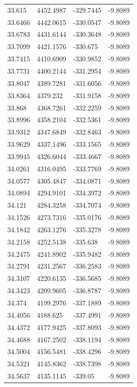 \begin{table}[H]
\begin{tabular}{llll}
33.615 & 4452.4987 & -329.7445 & -9.8089 \\
33.6466 & 4442.0615 & -330.0547 & -9.8089 \\
33.6783 & 4431.6144 & -330.3648 & -9.8089 \\
33.7099 & 4421.1576 & -330.675 & -9.8089 \\
33.7415 & 4410.6909 & -330.9852 & -9.8089 \\
33.7731 & 4400.2144 & -331.2954 & -9.8089 \\
33.8047 & 4389.7281 & -331.6056 & -9.8089 \\
33.8364 & 4379.232 & -331.9158 & -9.8089 \\
33.868 & 4368.7261 & -332.2259 & -9.8089 \\
33.8996 & 4358.2104 & -332.5361 & -9.8089 \\
33.9312 & 4347.6849 & -332.8463 & -9.8089 \\
33.9629 & 4337.1496 & -333.1565 & -9.8089 \\
33.9945 & 4326.6044 & -333.4667 & -9.8089 \\
34.0261 & 4316.0495 & -333.7769 & -9.8089 \\
34.0577 & 4305.4847 & -334.0871 & -9.8089 \\
34.0894 & 4294.9101 & -334.3972 & -9.8089 \\
34.121 & 4284.3258 & -334.7074 & -9.8089 \\
34.1526 & 4273.7316 & -335.0176 & -9.8089 \\
34.1842 & 4263.1276 & -335.3278 & -9.8089 \\
34.2158 & 4252.5138 & -335.638 & -9.8089 \\
34.2475 & 4241.8902 & -335.9482 & -9.8089 \\
34.2791 & 4231.2567 & -336.2583 & -9.8089 \\
34.3107 & 4220.6135 & -336.5685 & -9.8089 \\
34.3423 & 4209.9605 & -336.8787 & -9.8089 \\
34.374 & 4199.2976 & -337.1889 & -9.8089 \\
34.4056 & 4188.625 & -337.4991 & -9.8089 \\
34.4372 & 4177.9425 & -337.8093 & -9.8089 \\
34.4688 & 4167.2502 & -338.1194 & -9.8089 \\
34.5004 & 4156.5481 & -338.4296 & -9.8089 \\
34.5321 & 4145.8362 & -338.7398 & -9.8089 \\
34.5637 & 4135.1145 & -339.05 & -9.8089 \\

\end{tabular}
\end{table}

